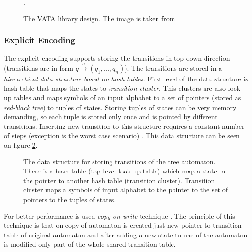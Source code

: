 \begin{figure}[bt]
\begin{center}

		\label{picVataDesign}
		\caption{The VATA library design. The image is taken from \cite{libvata}}.
\end{center}
\end{figure}

\subsubsection{Explicit Encoding}
\label{sectionExplicitEnc}
The explicit encoding supports storing the transitions in top-down direction (transitions are in form $q \xrightarrow{a} (q_1,...,q_n)$). The transitions
are stored in a \emph{hierarchical data structure based on hash tables}. First level of the data structure is hash table
that maps the states to \emph{transition cluster}. This clusters are also look-up tables and maps symbols of an input alphabet
to a set of pointers (stored as \emph{red-black tree}) to tuples of states. Storing tuples of states can be very memory demanding, so each tuple is stored
only once and is pointed by different transitions. 
Inserting new transition to this structure requires a constant number of steps (exception is the worst case scenario)
\cite{libvata}. This data structure can be seen on figure \ref{figExplicitTreeDataStr}.

\begin{figure}[bt]
\begin{center}

		\label{figExplicitTreeDataStr}
    \caption{The data structure for storing transitions of the tree automaton. There is a hash table (top-level look-up table) 
      which map a state to the pointer to another hash table (transition cluster). Transition cluster
      maps a symbols of input alphabet to the pointer to the set of pointers to the tuples of states.}
\end{center}
\end{figure}


For better performance is used \emph{copy-on-write} technique \cite{libvata}. The principle of this technique is 
that on copy of automaton is created just new pointer to transition table of original automaton and after adding a new state to one of the automaton 
is modified only part of the whole shared transition table. 

